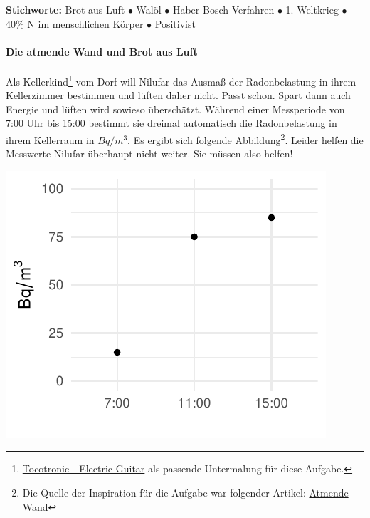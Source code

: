 \documentclass[a4paper, 9pt]{scrartcl}\usepackage[]{graphicx}\usepackage[]{xcolor}
\makeatletter
\def\maxwidth{ %
  \ifdim\Gin@nat@width>\linewidth
    \linewidth
  \else
    \Gin@nat@width
  \fi
}
\newenvironment{knitrout}{}{} %
\makeatother
\begin{document}
{\tiny\textbf{Stichworte:} Brot aus Luft $\bullet$ Walöl $\bullet$ Haber-Bosch-Verfahren $\bullet$ 1. Weltkrieg $\bullet$ 40\% N im menschlichen Körper $\bullet$ Positivist}




\paragraph{Die atmende Wand und Brot aus Luft}



Als Kellerkind\footnote{\href{https://www.youtube.com/watch?v=54H0HAJexVI}{Tocotronic - Electric Guitar} als passende Untermalung für diese Aufgabe.} vom Dorf will Nilufar das Ausmaß der Radonbelastung in ihrem Kellerzimmer bestimmen und lüften daher nicht. Passt schon. Spart dann auch Energie und lüften wird sowieso überschätzt. Während einer Messperiode von 7:00 Uhr bis 15:00 bestimmt sie dreimal automatisch die Radonbelastung in ihrem Kellerraum in $Bq/m^3$. Es ergibt sich folgende Abbildung\footnote{Die Quelle der Inspiration für die Aufgabe war folgender Artikel: \href{https://de.wikipedia.org/wiki/Atmende_Wand}{Atmende Wand}}. Leider helfen die Messwerte Nilufar überhaupt nicht weiter. Sie müssen also helfen! 

\begin{knitrout}
\color{fgcolor}

{\centering \includegraphics[width=\maxwidth]{img/math-10-1} 

}


\end{knitrout}
\end{document}
